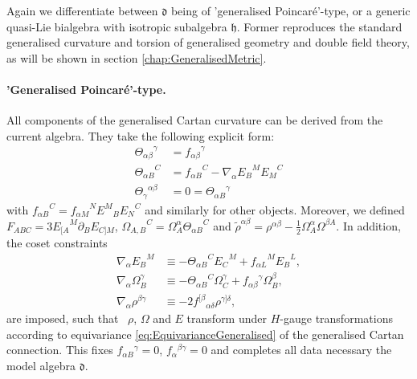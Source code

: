 \documentclass[11pt,a4paper]{article}
\numberwithin{equation}{section}
\begin{document}
Again we differentiate between $\mathfrak{d}$ being of 'generalised Poincar\'e'-type, or a generic quasi-Lie bialgebra with isotropic subalgebra $\mathfrak{h}$. Former reproduces the standard generalised curvature and torsion of generalised geometry and double field theory, as will be shown in section \ref{chap:GeneralisedMetric}.

\paragraph{'Generalised Poincar\'e'-type.} All components of the generalised Cartan curvature can be derived from the current algebra. They take the following explicit form:
\begin{align} \label{curvature}
	{\Theta_{\alpha \beta}}^\gamma &= {f_{\alpha \beta}}^\gamma \nonumber \\
	{\Theta_{\alpha B}}^C &= {f_{\alpha B}}^C - \nabla_\alpha {E_B}^M {E_M}^C \nonumber \\
	{\Theta_{\gamma}}^{\alpha \beta} &= 0 = {\Theta_{\alpha B}}^\gamma
\end{align}
with ${f_{\alpha B}}^C = {f_{\alpha M}}^N {E^M}_B {E_N}^C$ and similarly for other objects. Moreover, we defined $F_{ABC} = 3 {E_{[A}}^M \partial_B E_{C]M}$, ${\Omega_{A,B}}^C = {\Omega_A^\alpha} {\Theta_{\alpha B}}^C$ and $\tilde{\rho}^{\alpha \beta} = \rho^{\alpha \beta} - \frac{1}{2} \Omega^{\alpha}_A \Omega^{\beta A}$. In addition, the coset constraints
\begin{align}\label{eq:nablaalphas}
	\nabla_\alpha {E_B}^M &\equiv - {\Theta_{\alpha B}}^C {E_C}^M + {f_{\alpha L}}^M {E_B}^L, \\
	\nabla_\alpha \Omega_B^\gamma &\equiv - {\Theta_{\alpha B}}^C \Omega_C^\gamma + {f_{\alpha \beta }}^\gamma \Omega_B^\beta, \label{eq:ConnectionGaugeRegular}\\
	\nabla_\alpha \rho^{\beta\gamma} &\equiv - 2 {f^{[\beta}}_{\alpha \delta} \rho^{\gamma] \delta }, \nonumber
\end{align}
are imposed, such that \ $\rho$, $\Omega$ and $E$ transform under $H$-gauge transformations according to equivariance \eqref{eq:EquivarianceGeneralised} of the generalised Cartan connection. This fixes $f_{\alpha B}{}^\gamma = 0$, $f_{\alpha}{}^{\beta\gamma}=0$ and completes all data necessary the model algebra $\mathfrak{d}$.
\end{document}
